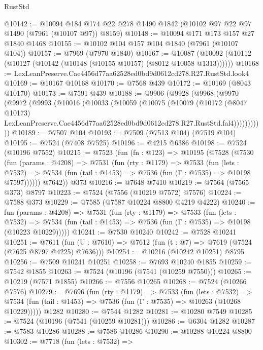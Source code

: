 \begin{lexlean}{RustStd}
\begin{coremodule}
@10142 := @10094
    @184
    @174
    @22
    @278
    @1490
    @1842
    (@10102 @97 @22 @97 @1490 (@7961 (@10107 @97)) @8159)
@10148 := @10094 @171 @173 @157 @27 @1840 @1468
@10155 := @10102 @104 @157 @104 @1840 (@7961 (@10107 @104))
@10157 := @7969 (@7970 @1840)
@10167 := @10087 (@10092 (@10112 (@10127 (@10142 (@10148 (@10155 @10157) (@8012 @10058 @1313))))))
@10168 := LexLeanPreserve.Cae4456d77aa62528ed0bd9d0612cd278.R27.RustStd.look4
@10169 := @10167 @10168
@10170 := @7568 @439
@10172 := @10169 (@8043 @10170)
@10173 := @7591 @439
@10188 := @9906
    (@9928
      (@9968
        (@9970
          (@9972
            (@9993
              (@10016
                (@10033
                  (@10059
                    (@10075
                      (@10079
                        (@10172
                          (@8047 @10173)
                          LexLeanPreserve.Cae4456d77aa62528ed0bd9d0612cd278.R27.RustStd.fal4)))))))))))
@10189 := @7507 @104
@10193 := @7509 (@7513 @104) (@7519 @104)
@10195 := @7524 (@7408 @7525)
@10196 := @4215 @6386
@10198 := @7524 (@10196 @7552)
@10215 := @7523
    (fun (fn : @123) =>
    @10195
      (@7528
        (@7530
          (fun (params : @4208) =>
          @7531
            (fun (rty : @1179) =>
            @7533
              (fun (lets : @7532) =>
              @7534 (fun (tail : @1453) => @7536 (fun (Γ : @7535) => @10198 @7597))))))
        @7642))
    @373
@10216 := @7648 @7410
@10219 := @7564 (@7565 @373) @8797
@10223 := @7524 (@7556 (@10219 @7572) @7576)
@10224 := @7588 @373
@10229 := @7585 (@7587 @10224 @8800 @4219 @4222)
@10240 := fun (params : @4208) =>
  @7531
    (fun (rty : @1179) =>
    @7533
      (fun (lets : @7532) =>
      @7534 (fun (tail : @1453) => @7536 (fun (Γ : @7535) => @10198 (@10223 @10229)))))
@10241 := @7530 @10240
@10242 := @7528 @10241
@10251 := @7611 (fun (U : @7610) => @7612 (fun (t : @7) => @7619 (@7524 (@7625 @8797 @4225) @7636)))
@10254 := @10216 (@10242 @10251) @8795
@10256 := @7509 @10241 @10251
@10258 := @7693 @10240 @1855
@10259 := @7542 @1855
@10263 := @7524 (@10196 (@7541 (@10259 @7550)))
@10265 := @10219 (@7571 @1855)
@10266 := @7556 @10265
@10268 := @7524 (@10266 @7576)
@10279 := @7696
    (fun (rty : @1179) =>
    @7533
      (fun (lets : @7532) =>
      @7534 (fun (tail : @1453) => @7536 (fun (Γ : @7535) => @10263 (@10268 @10229)))))
    @1282
@10280 := @7544 @1282
@10281 := @10280 @7549
@10285 := @7524 (@10196 (@7541 (@10259 @10281)))
@10286 := @6304 @1282
@10287 := @7583 @10286
@10288 := @7586 @10286
@10290 := @10288 @10224 @8800
@10302 := @7718
    (fun (lets : @7532) =>

\end{coremodule}
\end{lexlean}
